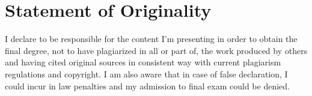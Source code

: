 \documentclass[11pt]{article}
\begin{document}

\newpage

\vfill
\section*{Statement of Originality}
I declare to be responsible for the content I’m presenting in order to obtain the final degree, not to have plagiarized in all or part of, the work produced by others and having cited original sources in consistent way with current plagiarism regulations and copyright. I am also aware that in case of false declaration, I could incur in law penalties and my admission to final exam could be denied.
\newpage



\newpage


\newpage

\tableofcontents
\listoftables
\listoffigures
\newpage

\pagestyle{fancy}












\end{document}

